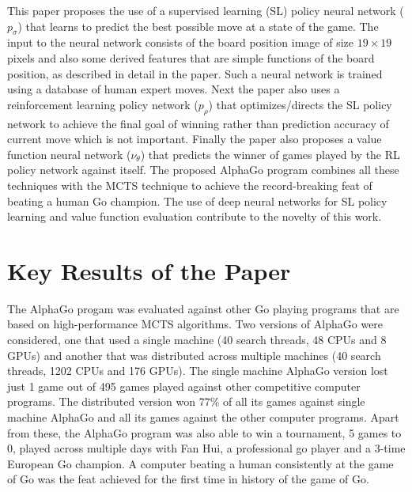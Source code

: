 \documentclass{article} %
\begin{document}
This paper proposes the use of a supervised learning (SL) policy neural network ($p_\sigma$) that learns to predict the best possible move at a state of the game. The input to the neural network consists of the board position image of size $19 \times 19$ pixels and also some derived features that are simple functions of the board position, as described in detail in the paper.
Such a neural network is trained using a database of human expert moves. Next the paper also uses a reinforcement learning policy network ($p_\rho$) that optimizes/directs the SL policy network to achieve the final goal of winning rather than prediction accuracy of current move which is not important. Finally the paper also proposes a value function neural network ($\nu_\theta$) that predicts the winner of games played by the RL policy network against itself. The proposed AlphaGo program combines all these techniques with the MCTS technique to achieve the record-breaking feat of beating a human Go champion. The use of deep neural networks for SL policy learning and value function evaluation contribute to the novelty of this work.

\section{Key Results of the Paper}
\label{sec:results}

The AlphaGo progam was evaluated against other Go playing programs that are based on high-performance MCTS algorithms. Two versions of AlphaGo were considered, one that used a single machine (40 search threads, 48 CPUs and 8 GPUs) and another that was distributed across multiple machines (40 search threads, 1202 CPUs and 176 GPUs). The single machine AlphaGo version lost just 1 game out of 495 games played against other competitive computer programs. The distributed version won 77\% of all its games against single machine AlphaGo and all its games against the other computer programs. Apart from these, the AlphaGo program was also able to win a tournament, 5 games to 0, played across multiple days with Fan Hui, a professional go player and a 3-time European Go champion. A computer beating a human consistently at the game of Go was the feat achieved for the first time in history of the game of Go.



% 
% 
\end{document}
